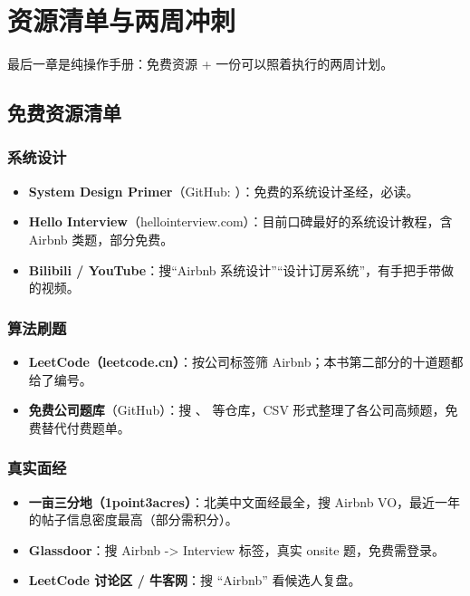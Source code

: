 \chapter{资源清单与两周冲刺}

最后一章是纯操作手册：免费资源 + 一份可以照着执行的两周计划。

\section{免费资源清单}

\subsection{系统设计}
\begin{itemize}
  \item \textbf{System Design Primer}（GitHub: ）：免费的系统设计圣经，必读。
  \item \textbf{Hello Interview}（hellointerview.com）：目前口碑最好的系统设计教程，含 Airbnb 类题，部分免费。
  \item \textbf{Bilibili / YouTube}：搜“Airbnb 系统设计”“设计订房系统”，有手把手带做的视频。
\end{itemize}

\subsection{算法刷题}
\begin{itemize}
  \item \textbf{LeetCode（leetcode.cn）}：按公司标签筛 Airbnb；本书第二部分的十道题都给了编号。
  \item \textbf{免费公司题库}（GitHub）：搜 、 等仓库，CSV 形式整理了各公司高频题，免费替代付费题单。
\end{itemize}

\subsection{真实面经}
\begin{itemize}
  \item \textbf{一亩三分地（1point3acres）}：北美中文面经最全，搜 Airbnb VO，最近一年的帖子信息密度最高（部分需积分）。
  \item \textbf{Glassdoor}：搜 Airbnb -> Interview 标签，真实 onsite 题，免费需登录。
  \item \textbf{LeetCode 讨论区 / 牛客网}：搜 “Airbnb” 看候选人复盘。
\end{itemize}


